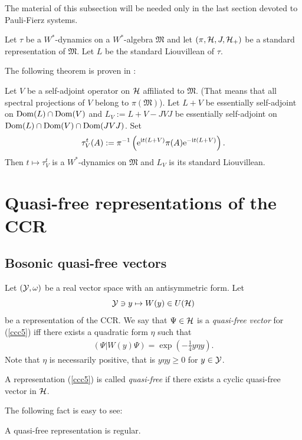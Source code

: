 \documentclass{svmult}
\newcommand{\beq}{\begin{equation}}
\newcommand{\eeq}{\end{equation}}
\def\bet{\begin{theorem}}
\def\eet{\end{theorem}}
\def\cY{{\cal Y}}
\def\fM{{\mathfrak M}}
\def\i{{\rm i}}
\def\Dom{{\rm Dom}}
\def\e{{\rm e}}
\def\cH{{\cal H}}
\def\e{{\rm e}}
\def\cH{{\cal H}}
\begin{document}
The material of this subsection will be needed only in the last section
devoted to Pauli-Fierz systems.

Let  $\tau$  be a $W^\ast$-dynamics on a  $W^*$-algebra $\fM$ and let
  $(\pi, \cH, J, \cH_+)$ be a standard representation of $\fM$. Let
 $L$ be  the standard Liouvillean of $\tau$.

The following theorem  is proven in  \cite{DJP}:

\bet   Let $V$ be a self-adjoint
operator on $\cH$
  affiliated to $\fM$. (That means that all spectral projections of
$V$ belong to $\pi(\fM)$). 
Let $L + V$ be essentially self-adjoint on $\Dom(L) 
\cap \Dom(V)$ and  
$L_V:= L + V - JVJ$ be essentially 
self-adjoint on $\Dom(L)\cap \Dom(V)\cap \Dom(
JVJ)$.
Set
\[\tau_V^t(A) := \pi^{-1} \left(\e^{\i t (L +V)}\pi(A)\e^{-\i t (L +
V)}\right).
\]
Then $t\mapsto\tau_V^t$ is a $W^\ast$-dynamics
 on $\fM$ and  $L_V$ is  its standard
Liouvillean.
\label{pertdyn}
\eet






\section{Quasi-free representations of the CCR}



\subsection{Bosonic quasi-free vectors}


Let $(\cY,\omega)$ be a real vector space with an antisymmetric form. Let
\beq \cY\ni y\mapsto W(y)\in U(\cH)\label{ccc5}\eeq
be  a representation of the CCR.
We say that $\Psi\in\cH$ is a {\em quasi-free vector} for (\ref{ccc5})
iff there exists a  quadratic form $\eta$ such that
\beq\begin{array}{l}
(\Psi|W(y)\Psi)=\exp(-\frac14y\eta y).\end{array}\label{bete}\eeq
Note that $\eta$ is necessarily positive, that is
$y\eta y\geq0$ for $y\in\cY$.

A representation (\ref{ccc5})
 is called {\em quasi-free} if there exists a cyclic
quasi-free vector in $\cH$.


The following fact is easy to see:

\bet A quasi-free representation is regular. \eet
\end{document}
